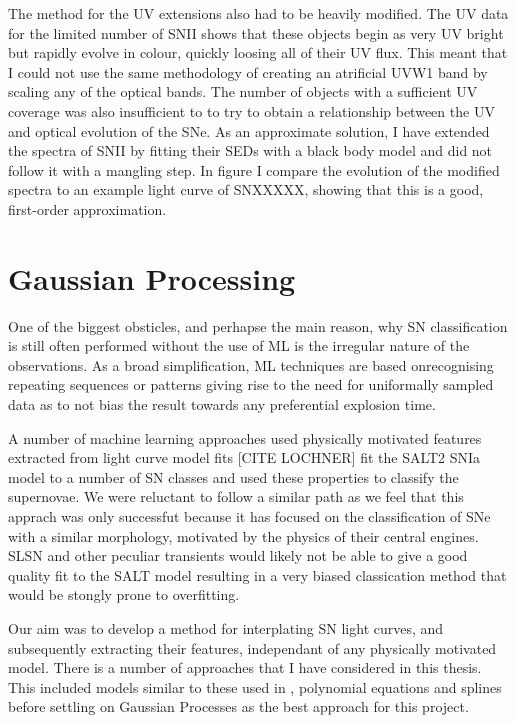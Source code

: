 The method for the UV extensions also had to be heavily modified. The UV data for the limited number of SNII shows that these objects begin as very UV bright but rapidly evolve in colour, quickly loosing all of their UV flux. This meant that I could not use the same methodology of creating an atrificial UVW1 band by scaling any of the optical bands. The number of objects with a sufficient UV coverage was also insufficient to to try to obtain a relationship between the UV and optical evolution of the SNe. As an approximate solution, I have extended the spectra of SNII by fitting their SEDs with a black body model and did not follow it with a mangling step. In figure  I compare the evolution of the modified spectra to an example light curve of SNXXXXX, showing that this is a good, first-order approximation.

\begin{figure}
  \caption{}
  \label{fig:SNIIbbExtension}
\end{figure}

\section{Gaussian Processing} \label{sec:GP}
One of the biggest obsticles, and perhapse the main reason, why SN classification is still often performed without the use of ML is the irregular nature of the observations. As a broad simplification, ML techniques are based onrecognising repeating sequences or patterns giving rise to the need for uniformally sampled data as to not bias the result towards any preferential explosion time.

A number of machine learning approaches used physically motivated features extracted from light curve model fits [CITE LOCHNER] fit the SALT2 SNIa model to a number of SN classes and used these properties to classify the supernovae. We were reluctant to follow a similar path as we feel that this apprach was only successfut because it has focused on the classification of SNe with a similar morphology, motivated by the physics of their central engines. SLSN and other peculiar transients would likely not be able to give a good quality fit to the SALT model resulting in a very biased classication method that would be stongly prone to overfitting.

Our aim was to develop a method for interplating SN light curves, and subsequently extracting their features, independant of any physically motivated model. There is a number of approaches that I have considered in this thesis. This included models similar to these used in , polynomial equations and splines before settling on Gaussian Processes as the best approach for this project.

